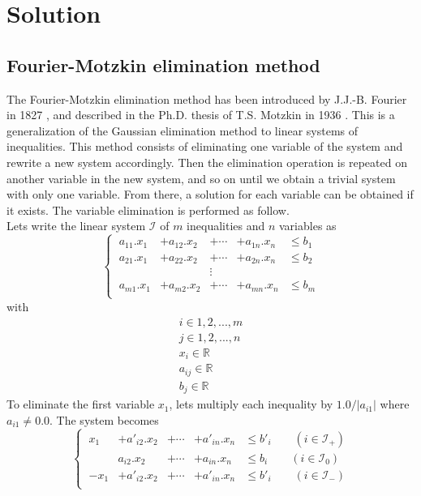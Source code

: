 \documentclass[12pt, a4paper]{article}
\begin{document}
\section{Solution}

\subsection{Fourier-Motzkin elimination method}

The Fourier-Motzkin elimination method has been introduced by J.J.-B. Fourier in 1827 \cite{fourier}, and described in the Ph.D. thesis of T.S. Motzkin in 1936 \cite{motzkin}. This is a generalization of the Gaussian elimination method to linear systems of inequalities. This method consists of eliminating one variable of the system and rewrite a new system accordingly. Then the elimination operation is repeated on another variable in the new system, and so on until we obtain a trivial system with only one variable. From there, a solution for each variable can be obtained if it exists. The variable elimination is performed as follow.\\
Lets write the linear system $\mathcal{I}$ of $m$ inequalities and $n$ variables as 
\begin{equation}
\left\{\
\begin{array}{ccccc}
a_{11}.x_1&+a_{12}.x_2&+\cdots&+a_{1n}.x_n &\le b_1\\
a_{21}.x_1&+a_{22}.x_2&+\cdots&+a_{2n}.x_n &\le b_2\\
&&\vdots&&\\
a_{m1}.x_1&+a_{m2}.x_2&+\cdots&+a_{mn}.x_n &\le b_m\\
\end{array}
\right.
\end{equation}
with
\begin{equation}
\begin{array}{c}
i\in{1, 2, ..., m}\\
j\in{1, 2, ..., n}\\
x_i\in\mathbb{R}\\
a_{ij}\in\mathbb{R}\\
b_j\in\mathbb{R} 
\end{array}
\end{equation}
To eliminate the first variable $x_1$, lets multiply each inequality by $1.0/|a_{i1}|$ where $a_{i1}\not=0.0$. The system becomes
\begin{equation}
\left\{\
\begin{array}{ccccc}
x_1&+a'_{i2}.x_2&+\cdots&+a'_{in}.x_n &\le b'_i\qquad(i\in\mathcal{I}_+)\\
&a_{i2}.x_2&+\cdots&+a_{in}.x_n &\le b_i\qquad(i\in\mathcal{I}_0)\\
-x_1&+a'_{i2}.x_2&+\cdots&+a'_{in}.x_n &\le b'_i\qquad(i\in\mathcal{I}_-)\\
\end{array}
\right.
\end{equation}
\end{document}
